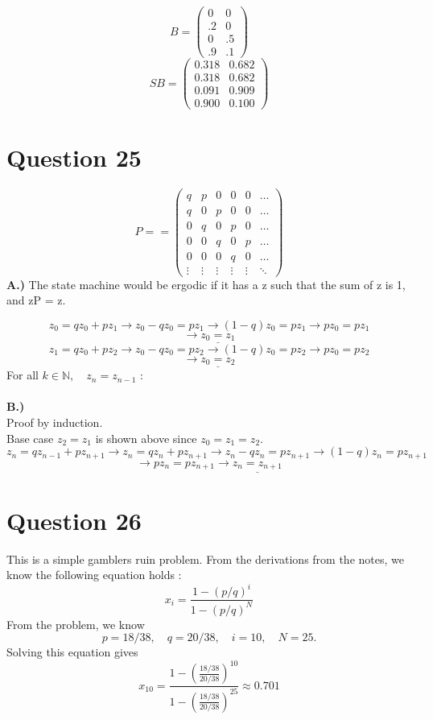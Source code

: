 \documentclass{article}
\begin{document}
   \[ B =\left(\begin{array}{rrrrr}
     0&0\\
   .2 & 0\\
   0 & .5\\
   .9 & .1 
     \end{array}\right)\]
     \[ SB =\left(\begin{array}{rrrrr} 
    0.318  & 0.682\\
   0.318  & 0.682\\
   0.091  & 0.909 \\
   0.900  & 0.100
          \end{array}\right)\]
\section*{Question 25}
\[P = =\left(\begin{array}{rrrrrr}
 q&p&0&0&0&\ldots\\
 q&0&p&0&0&\ldots\\
 0&q&0&p&0&\ldots\\
 0&0&q&0&p&\ldots\\
 0&0&0&q&0&\ldots\\
 \vdots&\vdots&\vdots&\vdots&\vdots&\ddots
\end{array}\right)\]
\textbf{A.)} The state machine would be ergodic if it has a z such that the sum
of z is 1, and zP = z. 

\[z_0 = qz_0 +pz_1 \longrightarrow z_0 - qz_0 = pz_1 \longrightarrow (1-q)z_0 =
pz_1 \longrightarrow pz_0 = pz_1 \]
\[\longrightarrow \underline{z_0 = z_1}\] 
\[z_1 = qz_0 + pz_2 \longrightarrow z_0 - qz_0 = pz_2  \longrightarrow (1-q)z_0 =
pz_2 \longrightarrow pz_0 = pz_2 \]
\[\longrightarrow \underline{z_0 = z_2}\] 
For all $k \in \mathbb{N},\quad z_n = z_{n-1}$ : 
\\\\\textbf{B.)}
\\Proof by induction.
\\Base case $z_2 = z_1$ is shown above since $z_0 = z_1 = z_2$.
\[z_n = qz_{n-1} + pz_{n+1}  \longrightarrow z_n = qz_n + pz_{n+1}
\longrightarrow z_n - qz_n = pz_{n+1} \longrightarrow (1 - q)z_n = pz_{n+1} \]
\[ \longrightarrow pz_n = pz_{n+1}  \longrightarrow \underline {z_n = z_{n+1}}\]

\section*{Question 26} This is a simple gamblers ruin problem. From the derivations from the notes, we
know the following equation holds : 
\[ x_i = \frac{1 - (p/q)^i}{1 - (p/q)^N}\]
From the problem, we know
\[ p = 18/38,\quad q = 20/38,\quad i = 10,\quad N=25.\]
Solving this equation gives 
\[x_{10} = \frac{1 - (\frac{18/38}{20/38})^{10}}{1 - (\frac{18/38}{20/38})^{25}}
\approx 0.701 \] 
\end{document}
